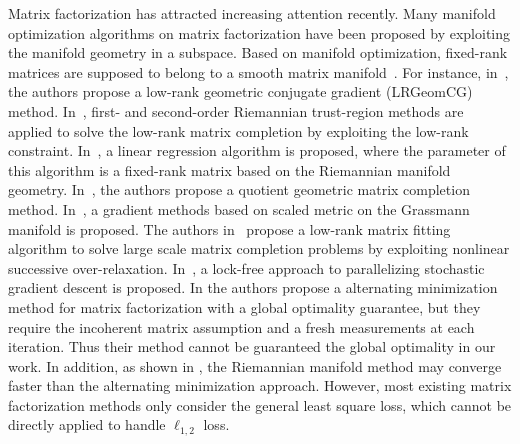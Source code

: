 \documentclass[10pt,twocolumn,letterpaper]{article}
\begin{document}
Matrix factorization has attracted increasing attention recently.
Many manifold optimization algorithms on matrix factorization have been proposed by exploiting the manifold geometry in a subspace.
Based on manifold optimization, fixed-rank matrices are supposed to belong to a smooth matrix manifold~\cite{Absil2008OAMM,vandereycken2013lowrank,rtrmc2011boumal,Bonnabel2011,Mishra2012,ngonips2012scaled}.
For instance, in~\cite{vandereycken2013lowrank}, the authors propose a low-rank geometric conjugate gradient (LRGeomCG) method.
In~\cite{rtrmc2011boumal}, first- and second-order Riemannian trust-region methods are applied to solve the low-rank matrix completion by exploiting the low-rank constraint.
In~\cite{Bonnabel2011}, a linear regression algorithm is proposed, where the parameter of this algorithm is a fixed-rank matrix based on the Riemannian manifold geometry.
In~\cite{Mishra2012}, the authors propose a quotient geometric matrix completion method.
In~\cite{ngonips2012scaled}, a gradient methods based on scaled metric on the Grassmann manifold is proposed.
The authors in~\cite{Wen2012} propose a low-rank matrix fitting algorithm to solve large scale matrix completion problems by exploiting nonlinear successive over-relaxation.
In~\cite{RechtNIPS2011hogwild}, a lock-free approach to parallelizing stochastic gradient descent is proposed.
In \cite{jain2013low} the authors propose a alternating minimization method for matrix factorization with a global optimality guarantee,
but they require the incoherent matrix assumption and a fresh measurements at each iteration.
Thus their method cannot be guaranteed the global optimality in our work.
In addition, as shown in \cite{vandereycken2013lowrank}, the Riemannian manifold method may converge faster than the alternating minimization approach.
However, most existing matrix factorization methods only consider the general least square loss, which cannot be directly applied to handle $\ell_{1,2}$ loss.
\end{document}

